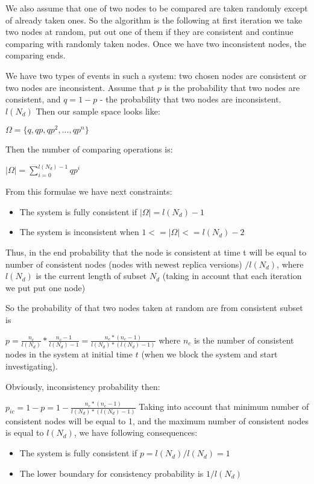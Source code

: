 \documentclass{llncs}
\begin{document}
We also assume that one of two nodes to be compared are taken randomly except of already taken ones. So the algorithm is the following at first iteration we take two nodes at random, put out one of them if they are consistent and continue comparing with randomly taken nodes. Once we have two inconsistent nodes, the comparing ends.

We have two types of events in such a system: two chosen nodes are consistent or two nodes are inconsistent.
Assume that $p$ is the probability that two nodes are consistent, and
$q = 1 -p$ - the probability that two nodes are inconsistent.
$l(N_d)$
Then our sample space looks like:

$\Omega = \{q, qp, qp^2, ..., qp^n\}$

Then the number of comparing operations is:

$\vert\Omega\vert = \sum_{i=0}^{l(N_d)-1}qp^i$

From this formulae we have next constraints:
\begin{itemize}
\item The system is fully consistent if $\vert\Omega\vert = l(N_d)-1$
\item The system is inconsistent when $1 <= \vert\Omega\vert <= l(N_d) -2$
\end{itemize}

Thus, in the end probability that the node is consistent at time t will be equal to number of consistent nodes (nodes with newest replica versions) $/ l(N_d)$, where $l(N_d)$ is the current length of subset $N_d$ (taking in account that each iteration we put put one node)

So the probability of that two nodes taken at random are from consistent subset is

$p = \frac{n_c}{l(N_d)} * \frac{n_c - 1}{l(N_d) - 1} = \frac{n_c * (n_c - 1)}{l(N_d)* (l(N_d) -1)}$ where $n_c$ is the number of consistent nodes in the system at initial time $t$ (when we block the system and start investigating).

Obviously, inconsistency probability then:

$p_{ic} = 1 - p = 1 - \frac{n_c * (n_c - 1)}{l(N_d)* (l(N_d) -1)}$
Taking into account that minimum number of consistent nodes will be equal to 1, and the maximum number of consistent nodes is equal to $l(N_d)$, we have following consequences:
\begin{itemize}
\item The system is fully consistent if $p = l(N_d) / l(N_d) = 1$
\item The lower boundary for consistency probability is $1 / l(N_d)$
\end{itemize}
\end{document}
